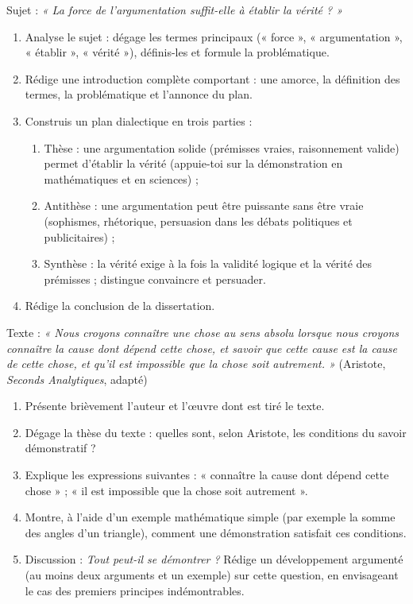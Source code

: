 \documentclass[11pt]{article}
\newcounter{popsec}
\newcounter{popsub}
\newcommand{\courssub}[1]{%
  \stepcounter{popsub}%
  \par\vspace{9pt}\noindent{\popxbold\fontsize{11.5}{13}\selectfont\color{popink}{\color{poporange}\thepopsec.\thepopsub}\hspace{6pt}#1}\par\nopagebreak\vspace{4pt}
}
\begin{document}
\courssub{Je me prépare au Bac}

\begin{exercice}
Sujet : \emph{« La force de l'argumentation suffit-elle à établir la vérité ? »}
\begin{enumerate}
\item Analyse le sujet : dégage les termes principaux (« force », « argumentation », « établir », « vérité »), définis-les et formule la problématique.
\item Rédige une introduction complète comportant : une amorce, la définition des termes, la problématique et l'annonce du plan.
\item Construis un plan dialectique en trois parties :
\begin{enumerate}
\item Thèse : une argumentation solide (prémisses vraies, raisonnement valide) permet d'établir la vérité (appuie-toi sur la démonstration en mathématiques et en sciences) ;
\item Antithèse : une argumentation peut être puissante sans être vraie (sophismes, rhétorique, persuasion dans les débats politiques et publicitaires) ;
\item Synthèse : la vérité exige à la fois la validité logique et la vérité des prémisses ; distingue convaincre et persuader.
\end{enumerate}
\item Rédige la conclusion de la dissertation.
\end{enumerate}
\end{exercice}

\begin{exercice}
Texte : \emph{« Nous croyons connaître une chose au sens absolu lorsque nous croyons connaître la cause dont dépend cette chose, et savoir que cette cause est la cause de cette chose, et qu'il est impossible que la chose soit autrement. »} (Aristote, \emph{Seconds Analytiques}, adapté)
\begin{enumerate}
\item Présente brièvement l'auteur et l'œuvre dont est tiré le texte.
\item Dégage la thèse du texte : quelles sont, selon Aristote, les conditions du savoir démonstratif ?
\item Explique les expressions suivantes : « connaître la cause dont dépend cette chose » ; « il est impossible que la chose soit autrement ».
\item Montre, à l'aide d'un exemple mathématique simple (par exemple la somme des angles d'un triangle), comment une démonstration satisfait ces conditions.
\item Discussion : \emph{Tout peut-il se démontrer ?} Rédige un développement argumenté (au moins deux arguments et un exemple) sur cette question, en envisageant le cas des premiers principes indémontrables.
\end{enumerate}
\end{exercice}
\end{document}
